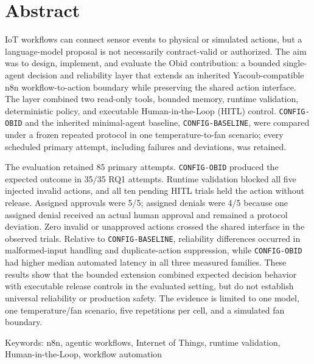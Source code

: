 \section*{Abstract}\label{sec:abstract}

\setlength{\emergencystretch}{2em}

IoT workflows can connect sensor events to physical or simulated actions, but a
language-model proposal is not necessarily contract-valid or authorized. The
aim was to design, implement, and evaluate the Obid contribution: a bounded
single-agent decision and reliability layer that extends an inherited
Yacoub-compatible n8n workflow-to-action boundary while preserving the shared
action interface. The layer combined two read-only tools, bounded memory,
runtime validation, deterministic policy, and executable Human-in-the-Loop
(HITL) control.
\texttt{CONFIG-OBID} and the inherited minimal-agent baseline,
\texttt{CONFIG-BASELINE}, were compared under a frozen repeated protocol in one
temperature-to-fan scenario; every scheduled primary attempt, including
failures and deviations, was retained.

The evaluation retained 85 primary attempts. \texttt{CONFIG-OBID} produced the
expected outcome in 35/35 RQ1 attempts. Runtime validation blocked all five
injected invalid actions, and all ten pending HITL trials held the action
without release. Assigned approvals were 5/5; assigned denials were 4/5 because
one assigned denial received an actual human approval and remained a protocol
deviation. Zero invalid or unapproved actions crossed the shared interface in
the observed trials. Relative to \texttt{CONFIG-BASELINE}, reliability
differences occurred in malformed-input handling and duplicate-action
suppression, while \texttt{CONFIG-OBID} had higher median automated latency in
all three measured families. These results show that the bounded extension
combined expected decision behavior with executable release controls in the
evaluated setting, but do not establish universal reliability or production
safety. The evidence is limited to one model, one temperature/fan scenario,
five repetitions per cell, and a simulated fan boundary.

Keywords: n8n, agentic workflows, Internet of Things, runtime validation,
Human-in-the-Loop, workflow automation

\setlength{\emergencystretch}{0pt}
